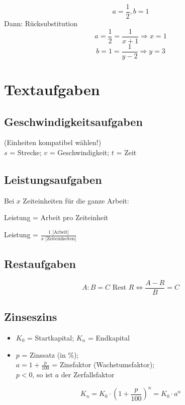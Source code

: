 \begin{multicols}{2}

$$a=\frac12, b=1$$
Dann: Rücksubstitution
$$a=\frac12=\frac{1}{x+1} \Longrightarrow  x=1$$
$$b=1=\frac{1}{y-2} \Longrightarrow  y=3$$


\forceCB
\keinHeaderUndKeinFooter{}

\section*{Textaufgaben}
\subsection*{Geschwindigkeitsaufgaben}
 (Einheiten kompatibel wählen!)\\
$s$ = Strecke; $v$ = Geschwindigkeit; $t$ = Zeit

\subsection*{Leistungsaufgaben}
Bei $x$ Zeiteinheiten für die ganze Arbeit:

Leistung = Arbeit pro Zeiteinheit

Leistung = $\frac{1 \textrm{ [Arbeit]}}{x \textrm{ [Zeiteinheiten]}}$


\subsection*{Restaufgaben}
$$A:B = C \textrm{ Rest } R \Leftrightarrow{}\frac{A-R}B=C$$


\subsection*{Zinseszins}
\begin{itemize}
\item $K_0$ = Startkapital; $K_n$ = Endkapital
\item $p$ = Zinssatz (in \%);\\ $a = 1+\frac{p}{100}$ = Zinsfaktor
(Wachstumsfaktor);\\ $p<0$, so ist $a$ der Zerfallsfaktor
\end{itemize}
$$K_n = K_0 \cdot{} \left( 1+\frac{p}{100} \right)^n = K_0\cdot{}a^n$$


\end{multicols}
